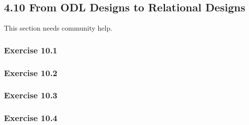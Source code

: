 \documentclass[../../main.tex]{subfiles}
\begin{document}
\subsection{4.10 From ODL Designs to Relational Designs}

This section needs community help.

\subsubsection*{Exercise 10.1}

\subsubsection*{Exercise 10.2}

\subsubsection*{Exercise 10.3}

\subsubsection*{Exercise 10.4}
\end{document}
